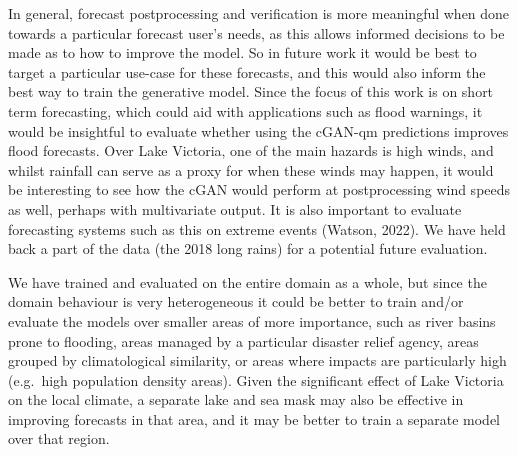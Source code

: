\documentclass{article}
\begin{document}
In general, forecast postprocessing and verification is more meaningful when done towards a particular forecast user's needs, as this allows informed decisions to be made as to how to improve the model. So in future work it would be best to target a particular use-case for these forecasts, and this would also inform the best way to train the generative model. Since the focus of this work is on short term forecasting, which could aid with applications such as flood warnings, it would be insightful to evaluate whether using the cGAN-qm predictions improves flood forecasts. Over Lake Victoria, one of the main hazards is high winds, and whilst rainfall can serve as a proxy for when these winds may happen, it would be interesting to see how the cGAN would perform at postprocessing wind speeds as well, perhaps with multivariate output. It is also important to evaluate forecasting systems such as this on extreme events (Watson, 2022). We have held back a part of the data (the 2018 long rains) for a potential future evaluation.

We have trained and evaluated on the entire domain as a whole, but since the domain behaviour is very heterogeneous it could be better to train and/or evaluate the models over smaller areas of more importance, such as river basins prone to flooding, areas managed by a particular disaster relief agency, areas grouped by climatological similarity, or areas where impacts are particularly high (e.g.~high population density areas). Given the significant effect of Lake Victoria on the local climate, a separate lake and sea mask may also be effective in improving forecasts in that area, and it may be better to train a separate model over that region.


\end{document}
